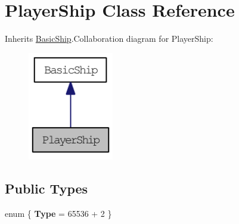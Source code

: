\hypertarget{class_player_ship}{
\section{PlayerShip Class Reference}
\label{class_player_ship}
}


Inherits \hyperlink{class_basic_ship}{BasicShip}.Collaboration diagram for PlayerShip:\nopagebreak
\begin{figure}[H]
\begin{center}
\leavevmode
\includegraphics[width=106pt]{class_player_ship__coll__graph}
\end{center}
\end{figure}
\subsection*{Public Types}
\begin{DoxyCompactItemize}
\item 
enum \{ {\bfseries Type} =  65536 + 2
 \}
\end{DoxyCompactItemize}
